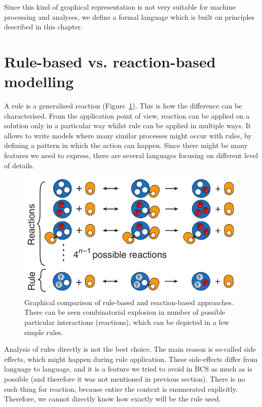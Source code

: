 \documentclass[12pt]{fithesis2}
\begin{document}
Since this kind of graphical representation is not very suitable for machine processing and analyses, we define a formal language which is built on principles described in this chapter.

\section{Rule-based vs. reaction-based modelling}

A rule is a generalised reaction (Figure~\ref{reaction_vs_rule}). This is how the difference can be characterised. From the application point of view, reaction can be applied on a solution only in a particular way whilst rule can be applied in multiple ways. It allows to write models where many similar processes might occur with rules, by defining a pattern in which the action can happen. Since there might be many features we need to express, there are several languages focusing on different level of details.

\begin{figure}[!h]
\begin{center}
\includegraphics[scale=0.5]{pics/reaction_vs_rule}
\end{center}
\caption{Graphical comparison of rule-based and reaction-based approaches. There can be seen combinatorial explosion in number of possible particular interactions (reactions), which can be depicted in a few simple rules.}\label{reaction_vs_rule}
\end{figure}

Analysis of rules directly is not the best choice. The main reason is so-called side effects, which might happen during rule application. These side-effects differ from language to language, and it is a feature we tried to avoid in BCS as much as is possible (and therefore it was not mentioned in previous section). There is no such thing for reaction, because entire the context is enumerated explicitly. Therefore, we cannot directly know how exactly will be the rule used.
\end{document}

